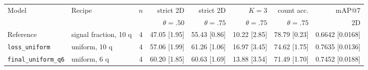 \begin{tabular}{llcrrrrr}
\toprule
Model & Recipe & $n$ & strict 2D & strict 2D & $K{=}3$ & count acc. & mAP@7 \\
 & & & $\theta{=}.50$ & $\theta{=}.75$ & $\theta{=}.75$ & $\theta{=}.75$ & 2D \\
\midrule
Reference & signal fraction, 10 q & 4 & 47.05 {\scriptsize[1.95]} & 55.43 {\scriptsize[0.86]} & 10.22 {\scriptsize[2.85]} & 78.79 {\scriptsize[0.23]} & 0.6642 {\scriptsize[0.0168]} \\
\texttt{loss\_uniform} & uniform, 10 q & 4 & 57.06 {\scriptsize[1.99]} & 61.26 {\scriptsize[1.06]} & 16.97 {\scriptsize[3.45]} & 74.62 {\scriptsize[1.75]} & 0.7635 {\scriptsize[0.0136]} \\
\texttt{final\_uniform\_q6} & uniform, 6 q & 4 & 60.20 {\scriptsize[1.85]} & 60.63 {\scriptsize[1.69]} & 13.88 {\scriptsize[3.54]} & 71.49 {\scriptsize[1.70]} & 0.7452 {\scriptsize[0.0188]} \\
\bottomrule
\end{tabular}

